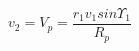 \begin{equation*}
v_{2} = V_{p} = \frac{r_{1}v_{1}sin\Upsilon_{1}}{R_{p}} \tag{4.23}
\end{equation*}
